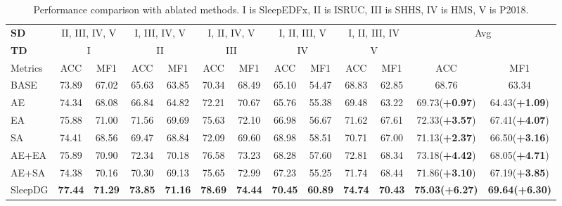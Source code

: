 \documentclass[letterpaper]{article} %
\begin{document}
	\begin{table}[tb]
		\centering
		\small
		\begin{tabular}{lcccccccccccc}
			\toprule
			\textbf{SD}& \multicolumn{2}{c}{II, III, IV, V} & \multicolumn{2}{c}{I, III, IV, V} & \multicolumn{2}{c}{I, II, IV, V} & \multicolumn{2}{c}{I, II, III, V} & \multicolumn{2}{c}{I, II, III, IV}& \multicolumn{2}{c}{\multirow{2}{*}{Avg}}\\
			\cmidrule(lr){1-1}\cmidrule(lr){2-3}\cmidrule(lr){4-5}\cmidrule(lr){6-7}\cmidrule(lr){8-9}\cmidrule(lr){10-11}
			\textbf{TD}&\multicolumn{2}{c}{I} & \multicolumn{2}{c}{II} & \multicolumn{2}{c}{III} & \multicolumn{2}{c}{IV} & \multicolumn{2}{c}{V}&&\\
			\cmidrule(lr){1-1}\cmidrule(lr){2-3}\cmidrule(lr){4-5}\cmidrule(lr){6-7}\cmidrule(lr){8-9}\cmidrule(lr){10-11}\cmidrule(lr){12-13}
			Metrics& ACC & MF1 & ACC & MF1 & ACC & MF1 & ACC & MF1 & ACC & MF1 & ACC & MF1 \\
			\midrule
			BASE&73.89&67.02&65.63&63.85&70.34&68.49&65.10&54.47&68.83&62.85&68.76&63.34\\
			AE&74.34&68.08&66.84&64.82&72.21&70.67&65.76&55.38&69.48&63.22&69.73(\textbf{+0.97})&64.43(\textbf{+1.09})\\
			EA&75.88&71.00&71.56&69.69&75.63&72.10&66.98&56.67&71.62&67.61&72.33(\textbf{+3.57})&67.41(\textbf{+4.07})\\
			SA&74.41&68.56&69.47&68.84&72.09&69.60&68.98&58.51&70.71&67.00&71.13(\textbf{+2.37})&66.50(\textbf{+3.16})\\
			AE+EA&75.89&70.90&72.34&70.18&76.58&73.23&68.28&57.60&72.81&68.34&73.18(\textbf{+4.42})&68.05(\textbf{+4.71})\\
			AE+SA&74.38&70.16&70.30&69.13&75.65&72.99&67.23&55.25&71.74&68.44&71.86(\textbf{+3.10})&67.19(\textbf{+3.85})\\
			\midrule
			SleepDG&\textbf{77.44}&\textbf{71.29}&\textbf{73.85}&\textbf{71.16}&\textbf{78.69}&\textbf{74.44}&\textbf{70.45}&\textbf{60.89}&\textbf{74.74}&\textbf{70.43}&\textbf{75.03(+6.27)}&\textbf{69.64(+6.30)}\\
			\bottomrule
		\end{tabular}
		\caption{Performance comparison with ablated methods. I is SleepEDFx, II is ISRUC, III is SHHS, IV is HMS, V is P2018.}\label{tab:AblationStudy}
	\end{table}
\end{document}
